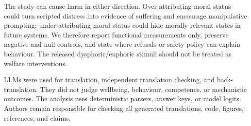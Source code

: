 The study can cause harm in either direction. Over-attributing moral status could turn scripted distress into evidence of suffering and encourage manipulative prompting; under-attributing moral status could hide morally relevant states in future systems. We therefore report functional measurements only, preserve negative and null controls, and state where refusals or safety policy can explain behaviour. The released dysphoric/euphoric stimuli should not be treated as welfare interventions.

LLMs were used for translation, independent translation checking, and back-translation. They did not judge wellbeing, behaviour, competence, or mechanistic outcomes. The analysis uses deterministic parsers, answer keys, or model logits. Authors remain responsible for checking all generated translations, code, figures, references, and claims.
